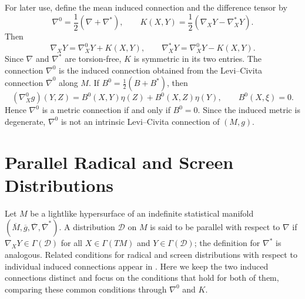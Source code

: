 \documentclass[11pt,a4paper]{article}
\theoremstyle{remark}
\theoremstyle{definition}
\begin{document}
For later use, define the mean induced connection and the
difference tensor by
\begin{equation}\label{eq:mean-difference}
\nabla^{0}=\frac{1}{2}\left(\nabla+\nabla^{*}\right),
\qquad
K(X,Y)=\frac{1}{2}\left(\nabla_{X}Y-\nabla^{*}_{X}Y\right).
\end{equation}
Then
\begin{equation}\label{eq:connection-decomposition}
\nabla_{X}Y=\nabla^{0}_{X}Y+K(X,Y),
\qquad
\nabla^{*}_{X}Y=\nabla^{0}_{X}Y-K(X,Y).
\end{equation}
Since $\nabla$ and $\nabla^{*}$ are torsion-free, $K$ is symmetric in its
two entries. The connection $\nabla^{0}$ is the induced connection obtained from the
Levi--Civita connection $\overline{\nabla}^{0}$ along $M$. If
$B^{0}=\frac12(B+B^{*})$, then
\begin{equation}\label{eq:nabla0-g}
(\nabla^{0}_{X}g)(Y,Z)
=
B^{0}(X,Y)\eta(Z)+B^{0}(X,Z)\eta(Y),
\qquad B^{0}(X,\xi)=0.
\end{equation}
Hence $\nabla^{0}$ is a metric connection if and only if $B^{0}=0$.
Since the induced metric is degenerate, $\nabla^{0}$ is not an intrinsic
Levi--Civita connection of $(M,g)$.

\section{Parallel Radical and Screen Distributions}
\label{sec:parallel}

Let $M$ be a lightlike hypersurface of an indefinite statistical manifold
$(\overline{M},\overline{g},\overline{\nabla},
\overline{\nabla}^{*})$. A distribution $\mathcal D$ on $M$ is said to
be parallel with respect to $\nabla$ if
$\nabla_XY\in\Gamma(\mathcal D)$ for all
$X\in\Gamma(TM)$ and $Y\in\Gamma(\mathcal D)$; the definition for
$\nabla^{*}$ is analogous. Related conditions for radical and screen distributions with respect to
individual induced connections appear in
\cite{JainSinghKumar2020,RaniKaur2021,BahadirTripathi2023}. Here we keep
the two induced connections distinct and focus on the conditions that hold for
both of them, comparing these common conditions through $\nabla^{0}$ and $K$.
\end{document}
